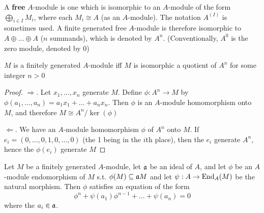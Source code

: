 \documentclass[11pt]{article}
\begin{document}
A \textbf{free} \(A\)-module is one which is isomorphic to an \(A\)-module of the form \(\bigoplus_{i\in I}M_i\),
where each \(M_i\cong A\) (as an \(A\)-module). The notation \(A^{(I)}\) is sometimes used. A finite
generated free \(A\)-module is therefore isomorphic to \(A\oplus\dots\oplus A\) (\(n\) summands), which is
denoted by \(A^n\). (Conventionally, \(A^0\) is the zero module, denoted by 0)

\begin{proposition}[]
\(M\) is a finitely generated \(A\)-module iff \(M\) is isomorphic a quotient of \(A^n\) for some
integer \(n>0\)
\end{proposition}

\begin{proof}
\(\Rightarrow\). Let \(x_1,\dots,x_n\) generate \(M\). Define \(\phi:A^n\to M\) by \(\phi(a_1,\dots,a_n)=a_1x_1+\dots+a_nx_n\).
Then \(\phi\) is an \(A\)-module homomorphism onto \(M\), and therefore \(M\cong A^n/\ker(\phi)\)

\(\Leftarrow\). We have an \(A\)-module homomorphism \(\phi\) of \(A^n\) onto \(M\). If \(e_i=(0,\dots,0,1,0,\dots,0)\)
(the 1 being in the \(i\)th place), then the \(e_i\) generate \(A^n\), hence the \(\phi(e_i)\)
generate \(M\)
\end{proof}

\begin{proposition}[]
\label{2.4}
Let \(M\) be a finitely generated \(A\)-module, let \(\mathfrak{a}\) be an ideal of \(A\), and let \(\phi\) be
an \(A\)-module endomorphism of \(M\) s.t. \(\phi(M)\subseteq\mathfrak{a} M\) and let
\(\psi:A\to\operatorname{End}_A(M)\) be the natural morphism. Then \(\phi\) satisfies an equation of the
form
\begin{equation*}
\phi^n+\psi(a_1)\phi^{n-1}+\dots+\psi(a_n)=0
\end{equation*}
where the \(a_i\in\mathfrak{a}\).
\end{proposition}
\end{document}
